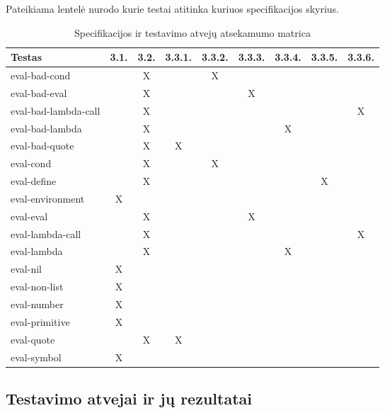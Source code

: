 \documentclass{VUMIFPSkursinis}
\begin{document}
Pateikiama lentelė nurodo kurie testai atitinka kuriuos specifikacijos skyrius.

\begin{table}[H]\footnotesize
  \centering
  \caption{Specifikacijos ir testavimo atvejų atsekamumo matrica}
  {\begin{tabular}{|l|c|c|c|c|c|c|c|c|} \hline
    Testas & 3.1. & 3.2. & 3.3.1. & 3.3.2. & 3.3.3. & 3.3.4. & 3.3.5. & 3.3.6. \\
    \hline
    eval-bad-cond        &   & X &   & X &   &   &   &    \\
    eval-bad-eval        &   & X &   &   & X &   &   &    \\
    eval-bad-lambda-call &   & X &   &   &   &   &   & X  \\
    eval-bad-lambda      &   & X &   &   &   & X &   &    \\
    eval-bad-quote       &   & X & X &   &   &   &   &    \\
    eval-cond            &   & X &   & X &   &   &   &    \\
    eval-define          &   & X &   &   &   &   & X &    \\
    eval-environment     & X &   &   &   &   &   &   &    \\
    eval-eval            &   & X &   &   & X &   &   &    \\
    eval-lambda-call     &   & X &   &   &   &   &   & X  \\
    eval-lambda          &   & X &   &   &   & X &   &    \\
    eval-nil             & X &   &   &   &   &   &   &    \\
    eval-non-list        & X &   &   &   &   &   &   &    \\
    eval-number          & X &   &   &   &   &   &   &    \\
    eval-primitive       & X &   &   &   &   &   &   &    \\
    eval-quote           &   & X & X &   &   &   &   &    \\
    eval-symbol          & X &   &   &   &   &   &   &    \\
    \hline
  \end{tabular}}
  \label{tab:table example}
\end{table}


\subsection{Testavimo atvejai ir jų rezultatai}
\end{document}
